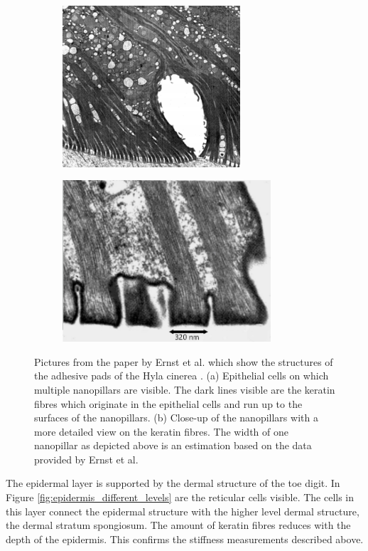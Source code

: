 \begin{figure}[h!] 
\begin{subfigure}{0.48\textwidth}
    \centering
    \includegraphics[width=\linewidth, height=6cm, angle=0]{images/epidermal structure/epithelial_cells_and_nanopillars_ernst.PNG}
    \caption{}
    \label{}
\end{subfigure}
\hfill
\begin{subfigure}{0.48\textwidth}
    \centering
    \includegraphics[width=\linewidth, height=6cm, angle=0]{images/epidermal structure/nanopillars_ernst.PNG}
    \caption{}
    \label{}
\end{subfigure}
 \caption{Pictures from the paper by Ernst et al. which show the structures of the adhesive pads of the Hyla cinerea \cite{ernst1973digital}. (a) Epithelial cells on which multiple nanopillars are visible. The dark lines visible are the keratin fibres which originate in the epithelial cells and run up to the surfaces of the nanopillars. (b) Close-up of the nanopillars with a more detailed view on the keratin fibres. The width of one nanopillar as depicted above is an estimation based on the data provided by Ernst et al.}
 \label{fig:nanopillars}
\end{figure}

\qquad The epidermal layer is supported by the dermal structure of the toe digit. In Figure \ref{fig:epidermis_different_levels} are the reticular cells visible. The cells in this layer connect the epidermal structure with the higher level dermal structure, the dermal stratum spongiosum. The amount of keratin fibres reduces with the depth of the epidermis. This confirms the stiffness measurements described above.\\ 

